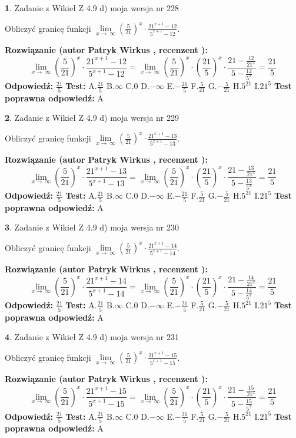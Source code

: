 \documentclass[12pt, a4paper]{article}
\theoremstyle{definition} %
\newtheorem{zad}{}
\newcommand{\zadStart}[1]{\begin{zad}#1\newline}
\newcommand{\zadStop}{\end{zad}}
\newcommand{\rozwStart}[2]{\noindent \textbf{Rozwiązanie (autor #1 , recenzent #2): }\newline}
\newcommand{\rozwStop}{\newline}
\newcommand{\odpStart}{\noindent \textbf{Odpowiedź:}\newline}
\newcommand{\odpStop}{\newline}
\newcommand{\testStart}{\noindent \textbf{Test:}\newline}
\newcommand{\testStop}{\newline}
\newcommand{\kluczStart}{\noindent \textbf{Test poprawna odpowiedź:}\newline}
\newcommand{\kluczStop}{\newline}
\begin{document}
\zadStart{Zadanie z Wikieł Z 4.9 d) moja wersja nr 228}


Obliczyć granicę funkcji  $\lim\limits_{x\to\ \infty}(\frac{5}{21})^{x}\cdot\frac{21^{x+1}-12}{5^{x+1}-12}$.
\zadStop
\rozwStart{Patryk Wirkus}{}
$$\lim\limits_{x\to\ \infty}(\frac{5}{21})^{x}\cdot\frac{21^{x+1}-12}{5^{x+1}-12}=\lim\limits_{x\to\ \infty}(\frac{5}{21})^{x}\cdot(\frac{21}{5})^{x} \cdot \frac{21-\frac{12}{21^{x}}}{5-\frac{12}{5^{x}}} = \frac{21}{5}$$
\rozwStop
\odpStart
$\frac{21}{5}$
\odpStop
\testStart
A.$\frac{21}{5}$ B.$\infty$ C.$0$ D.$-\infty$ E.$-\frac{21}{5}$
F.$\frac{5}{21}$ G.$-\frac{5}{21}$
H.$5^{21}$
I.$21^{5}$
\testStop
\kluczStart
A
\kluczStop



\zadStart{Zadanie z Wikieł Z 4.9 d) moja wersja nr 229}


Obliczyć granicę funkcji  $\lim\limits_{x\to\ \infty}(\frac{5}{21})^{x}\cdot\frac{21^{x+1}-13}{5^{x+1}-13}$.
\zadStop
\rozwStart{Patryk Wirkus}{}
$$\lim\limits_{x\to\ \infty}(\frac{5}{21})^{x}\cdot\frac{21^{x+1}-13}{5^{x+1}-13}=\lim\limits_{x\to\ \infty}(\frac{5}{21})^{x}\cdot(\frac{21}{5})^{x} \cdot \frac{21-\frac{13}{21^{x}}}{5-\frac{13}{5^{x}}} = \frac{21}{5}$$
\rozwStop
\odpStart
$\frac{21}{5}$
\odpStop
\testStart
A.$\frac{21}{5}$ B.$\infty$ C.$0$ D.$-\infty$ E.$-\frac{21}{5}$
F.$\frac{5}{21}$ G.$-\frac{5}{21}$
H.$5^{21}$
I.$21^{5}$
\testStop
\kluczStart
A
\kluczStop



\zadStart{Zadanie z Wikieł Z 4.9 d) moja wersja nr 230}


Obliczyć granicę funkcji  $\lim\limits_{x\to\ \infty}(\frac{5}{21})^{x}\cdot\frac{21^{x+1}-14}{5^{x+1}-14}$.
\zadStop
\rozwStart{Patryk Wirkus}{}
$$\lim\limits_{x\to\ \infty}(\frac{5}{21})^{x}\cdot\frac{21^{x+1}-14}{5^{x+1}-14}=\lim\limits_{x\to\ \infty}(\frac{5}{21})^{x}\cdot(\frac{21}{5})^{x} \cdot \frac{21-\frac{14}{21^{x}}}{5-\frac{14}{5^{x}}} = \frac{21}{5}$$
\rozwStop
\odpStart
$\frac{21}{5}$
\odpStop
\testStart
A.$\frac{21}{5}$ B.$\infty$ C.$0$ D.$-\infty$ E.$-\frac{21}{5}$
F.$\frac{5}{21}$ G.$-\frac{5}{21}$
H.$5^{21}$
I.$21^{5}$
\testStop
\kluczStart
A
\kluczStop



\zadStart{Zadanie z Wikieł Z 4.9 d) moja wersja nr 231}


Obliczyć granicę funkcji  $\lim\limits_{x\to\ \infty}(\frac{5}{21})^{x}\cdot\frac{21^{x+1}-15}{5^{x+1}-15}$.
\zadStop
\rozwStart{Patryk Wirkus}{}
$$\lim\limits_{x\to\ \infty}(\frac{5}{21})^{x}\cdot\frac{21^{x+1}-15}{5^{x+1}-15}=\lim\limits_{x\to\ \infty}(\frac{5}{21})^{x}\cdot(\frac{21}{5})^{x} \cdot \frac{21-\frac{15}{21^{x}}}{5-\frac{15}{5^{x}}} = \frac{21}{5}$$
\rozwStop
\odpStart
$\frac{21}{5}$
\odpStop
\testStart
A.$\frac{21}{5}$ B.$\infty$ C.$0$ D.$-\infty$ E.$-\frac{21}{5}$
F.$\frac{5}{21}$ G.$-\frac{5}{21}$
H.$5^{21}$
I.$21^{5}$
\testStop
\kluczStart
A
\kluczStop
\end{document}
